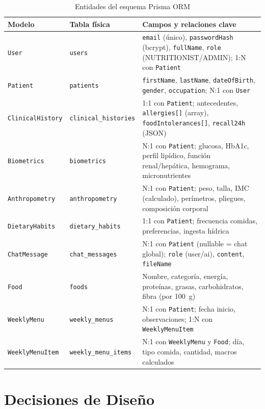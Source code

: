 \documentclass[12pt,a4paper]{article}
\begin{document}
\begin{table}[H]
\centering
\caption{Entidades del esquema Prisma ORM}
\label{tab:modelos}
\begin{tabularx}{\linewidth}{|l|l|X|}
\hline
\textbf{Modelo} & \textbf{Tabla física} & \textbf{Campos y relaciones clave} \\
\hline
\texttt{User} & \texttt{users} & \texttt{email} (único), \texttt{passwordHash} (bcrypt), \texttt{fullName}, \texttt{role} (NUTRITIONIST/ADMIN); 1:N con \texttt{Patient} \\
\hline
\texttt{Patient} & \texttt{patients} & \texttt{firstName}, \texttt{lastName}, \texttt{dateOfBirth}, \texttt{gender}, \texttt{occupation}; N:1 con \texttt{User} \\
\hline
\texttt{ClinicalHistory} & \texttt{clinical\_histories} & 1:1 con \texttt{Patient}; antecedentes, \texttt{allergies[]} (array), \texttt{foodIntolerances[]}, \texttt{recall24h} (JSON) \\
\hline
\texttt{Biometrics} & \texttt{biometrics} & N:1 con \texttt{Patient}; glucosa, HbA1c, perfil lipídico, función renal/hepática, hemograma, micronutrientes \\
\hline
\texttt{Anthropometry} & \texttt{anthropometry} & N:1 con \texttt{Patient}; peso, talla, IMC (calculado), perímetros, pliegues, composición corporal \\
\hline
\texttt{DietaryHabits} & \texttt{dietary\_habits} & 1:1 con \texttt{Patient}; frecuencia comidas, preferencias, ingesta hídrica \\
\hline
\texttt{ChatMessage} & \texttt{chat\_messages} & N:1 con \texttt{Patient} (nullable = chat global); \texttt{role} (user/ai), \texttt{content}, \texttt{fileName} \\
\hline
\texttt{Food} & \texttt{foods} & Nombre, categoría, energía, proteínas, grasas, carbohidratos, fibra (por 100~g) \\
\hline
\texttt{WeeklyMenu} & \texttt{weekly\_menus} & N:1 con \texttt{Patient}; fecha inicio, observaciones; 1:N con \texttt{WeeklyMenuItem} \\
\hline
\texttt{WeeklyMenuItem} & \texttt{weekly\_menu\_items} & N:1 con \texttt{WeeklyMenu} y \texttt{Food}; día, tipo comida, cantidad, macros calculados \\
\hline
\end{tabularx}
\end{table}

\clearpage
\section{Decisiones de Diseño}
\end{document}
